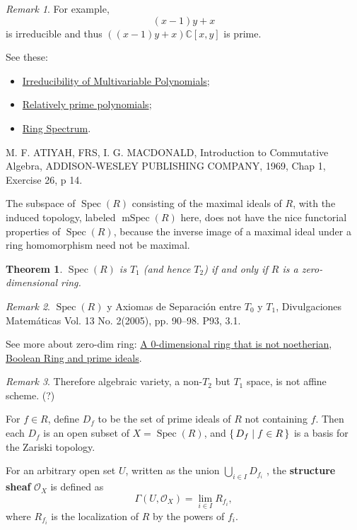 \documentclass[12pt, letterpaper]{article}
\newcommand{\co}{\mathbb{C}}
\newtheorem{thm}[prop]{Theorem}
\theoremstyle{definition}
\theoremstyle{remark}
\newtheorem*{rem*}{Remark}
\theoremstyle{definition}
\theoremstyle{plain}
\numberwithin{equation}{section}
\begin{document}
\begin{rem*}
		For example,
		\[ (x-1)y+x \]
		is irreducible and thus $ ((x-1)y+x) \co[x,y]$ is prime.
		 
		See these: 
		\begin{itemize}
			\item 
			\href{https://math.stackexchange.com/questions/270687/irreducibility-of-multivariable-polynomials}{Irreducibility of Multivariable Polynomials};
			\item
			\href{https://stacks.math.columbia.edu/tag/09GW}{Relatively prime polynomials};
			\item
			\href{https://mathworld.wolfram.com/RingSpectrum.html}{Ring Spectrum}.
		\end{itemize}
		
		M. F. ATIYAH, FRS,
		I. G. MACDONALD,
		Introduction to
		Commutative Algebra,
		ADDISON-WESLEY PUBLISHING COMPANY, 1969,
		Chap 1, Exercise 26, p 14.
		
		The subspace of $\operatorname{Spec}(R)$ consisting of the maximal ideals of $R$,
		with the induced topology, labeled $\operatorname{mSpec}(R)$ here,
		 does not have the nice functorial
		properties of $\operatorname{Spec} (R)$, because the inverse image of a maximal
		ideal under a ring homomorphism need not be maximal. 

		
		
	\end{rem*}
	
	\begin{thm}
		$\operatorname{Spec}(R)$ is $T_1$ (and hence $T_2$)
		if and only if
		$R$ is a zero-dimensional ring.
	\end{thm}
	\begin{rem*}
		$\operatorname{Spec}(R)$ y Axiomas de Separación
		entre $T_0$ y $T_1$,
		Divulgaciones Matemáticas Vol. 13 No. 2(2005), pp. 90–98.
		P93, 3.1.
		
		See more about zero-dim ring:
		\href{https://mathoverflow.net/questions/93289/a-0-dimensional-ring-that-is-not-noetherian}{A 0-dimensional ring that is not noetherian},
		\href{https://math.stackexchange.com/questions/1446699/boolean-ring-and-prime-ideals}{Boolean Ring and prime ideals}.
	\end{rem*}
	\begin{rem*}
		Therefore algebraic variety, a non-$T_2$ but $T_1$ space, is not affine scheme. (?)
	\end{rem*}

	\begin{def*}
		For $f \in R$, define $D_f$ to be the set of prime ideals of $R$ not containing $f$.
		Then each $D_f$ is an open subset of $X=\operatorname {Spec} (R)$,
		and $\set{D_{f}|f\in R}$ is a basis for the Zariski topology.
		
		For an arbitrary open set $U$, written as the union $\bigcup_{i\in I}D_{f_i}$ ,
		the \textbf{structure sheaf} $\mathcal{O}_X$ is defined as
		\[\Gamma(U,\mathcal{O}_X) = \lim_{i\in I} R_{f_i},\]
		where $R_{f_i}$ is the localization of $R$ by the powers of $f_i$.
	\end{def*}
\end{document}

